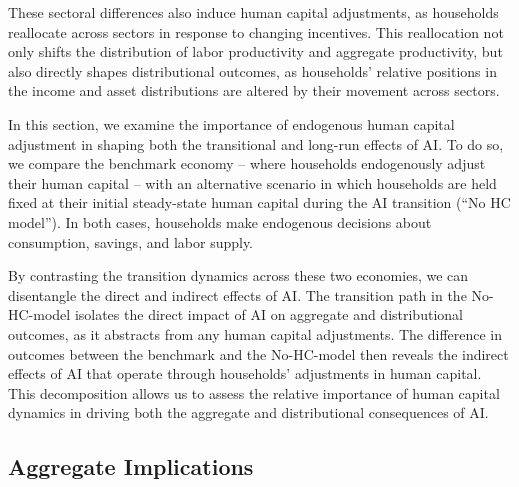 \documentclass[12pt]{article}
\begin{document}
These sectoral differences also induce human capital adjustments, as households reallocate across sectors in response to changing incentives. This reallocation not only shifts the distribution of labor productivity and aggregate productivity, but also directly shapes distributional outcomes, as households’ relative positions in the income and asset distributions are altered by their movement across sectors.

In this section, we examine the importance of endogenous human capital adjustment in shaping both the transitional and long-run effects of AI. To do so, we compare the benchmark economy -- where households endogenously adjust their human capital -- with an alternative scenario in which households are held fixed at their initial steady-state human capital during the AI transition (“No HC model”). In both cases, households make endogenous decisions about consumption, savings, and labor supply. 

By contrasting the transition dynamics across these two economies, we can disentangle the direct and indirect effects of AI. The transition path in the No-HC-model isolates the direct impact of AI on aggregate and distributional outcomes, as it abstracts from any human capital adjustments. The difference in outcomes between the benchmark and the No-HC-model then reveals the indirect effects of AI that operate through households’ adjustments in human capital. This decomposition allows us to assess the relative importance of human capital dynamics in driving both the aggregate and distributional consequences of AI.


\subsection{Aggregate Implications}\label{sec:result}
\end{document}
